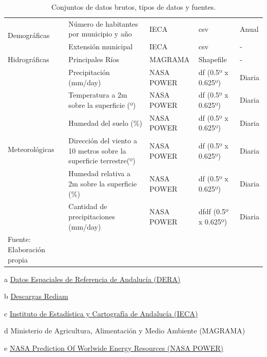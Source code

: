 \documentclass[12pt,a4paper,]{book}
\numberwithin{dummy}{section}
\theoremstyle{ocrenumbox}
\theoremstyle{blacknumex}
\theoremstyle{blacknumbox}
\theoremstyle{ocrenum}
\theoremstyle{ocrenum}
\begin{document}
\begin{table}
\begin{threeparttable}[]
{\begin{tabular}{lllll}
\multirow{2}{*}{Demográficas}   & Número de habitantes por municipio y año                       & IECA\tnote{c}       & csv                & Anual      \\
                                & Extensión municipal                                            & IECA\tnote{c}       & csv                & -      \\ \hline
Hidrográficas                   & Principales Ríos                                               & MAGRAMA\tnote{d}    & Shapefile          & -          \\ \hline
\multirow{6}{*}{Meteorológicas} & Precipitación (mm/day)                                         & NASA POWER\tnote{e} & df (0.5º x 0.625º) & Diaria     \\
                                & Temperatura a 2m sobre la superficie (º)                       & NASA POWER & df (0.5º x 0.625º) & Diaria     \\
                                & Humedad del suelo (\%)                                         & NASA POWER & df (0.5º x 0.625º) & Diaria     \\
                                & Dirección del viento a 10 metros sobre la superficie terrestre(º) & NASA POWER & df (0.5º x 0.625º) & Diaria     \\
                                & Humedad relativa a 2m sobre la superficie (\%)                 & NASA POWER & df (0.5º x 0.625º) & Diaria     \\
                                & Cantidad de precipitaciones (mm/day)                           & NASA POWER & dfdf (0.5º x 0.625º) & Diaria     \\ \hline
\footnotesize Fuente: Elaboración propia
\end{tabular}}
\begin{tablenotes}
\raggedright
\item[a] {\footnotesize \href{https://www.juntadeandalucia.es/institutodeestadisticaycartografia/dega/datos-espaciales-de-referencia-de-andalucia-dera/descarga-de-informacion}{Datos Espaciales de Referencia de Andalucía (DERA)}}
\item[b] {\footnotesize \href{https://portalrediam.cica.es/descargas?path=%2F}{Descargas Rediam}}%
\item[c] {\footnotesize \href{https://www.juntadeandalucia.es/institutodeestadisticaycartografia/dega/}{Instituto de Estadística y Cartografía de Andalucía (IECA)}}
\item[d] {\footnotesize Ministerio de Agricultura, Alimentación y Medio Ambiente (MAGRAMA)}
\item[e] {\footnotesize \href{https://power.larc.nasa.gov/#resources}{NASA Prediction Of Worlwide Energy Resources (NASA POWER)}}
\end{tablenotes}
\caption{Conjuntos de datos brutos, tipos de datos y fuentes.}
\label{tab:fuentes}
\end{threeparttable}
\end{table}
\end{document}
